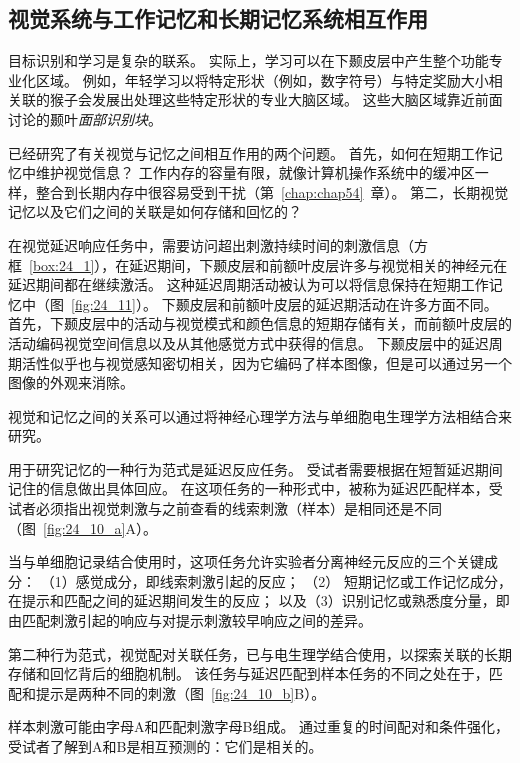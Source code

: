 \subsection{视觉系统与工作记忆和长期记忆系统相互作用}

目标识别和学习是复杂的联系。
实际上，学习可以在下颞皮层中产生整个功能专业化区域。
例如，年轻学习以将特定形状（例如，数字符号）与特定奖励大小相关联的猴子会发展出处理这些特定形状的专业大脑区域。
这些大脑区域靠近前面讨论的颞叶\textit{面部识别块}。


已经研究了有关视觉与记忆之间相互作用的两个问题。
首先，如何在短期工作记忆中维护视觉信息？
工作内存的容量有限，就像计算机操作系统中的缓冲区一样，整合到长期内存中很容易受到干扰（第~\ref{chap:chap54}~章）。
第二，长期视觉记忆以及它们之间的关联是如何存储和回忆的？


在视觉延迟响应任务中，需要访问超出刺激持续时间的刺激信息（方框~\ref{box:24_1}），在延迟期间，下颞皮层和前额叶皮层许多与视觉相关的神经元在延迟期间都在继续激活。
这种延迟周期活动被认为可以将信息保持在短期工作记忆中（图~\ref{fig:24_11}）。
下颞皮层和前额叶皮层的延迟期活动在许多方面不同。
首先，下颞皮层中的活动与视觉模式和颜色信息的短期存储有关，而前额叶皮层的活动编码视觉空间信息以及从其他感觉方式中获得的信息。
下颞皮层中的延迟周期活性似乎也与视觉感知密切相关，因为它编码了样本图像，但是可以通过另一个图像的外观来消除。


\begin{proposition}[视觉与工作记忆的相互作用研究] \label{box:24_1}
	
	\quad \quad 视觉和记忆之间的关系可以通过将神经心理学方法与单细胞电生理学方法相结合来研究。
	
	\quad \quad 用于研究记忆的一种行为范式是延迟反应任务。
	受试者需要根据在短暂延迟期间记住的信息做出具体回应。
	在这项任务的一种形式中，被称为延迟匹配样本，受试者必须指出视觉刺激与之前查看的线索刺激（样本）是相同还是不同（图~\ref{fig:24_10_a}A）。
	
	\quad \quad 当与单细胞记录结合使用时，这项任务允许实验者分离神经元反应的三个关键成分：
	（1）感觉成分，即线索刺激引起的反应；
	（2） 短期记忆或工作记忆成分，在提示和匹配之间的延迟期间发生的反应；
	以及（3）识别记忆或熟悉度分量，即由匹配刺激引起的响应与对提示刺激较早响应之间的差异。
	
	\quad \quad 第二种行为范式，视觉配对关联任务，已与电生理学结合使用，以探索关联的长期存储和回忆背后的细胞机制。
	该任务与延迟匹配到样本任务的不同之处在于，匹配和提示是两种不同的刺激（图~\ref{fig:24_10_b}B）。
	
	\quad \quad 样本刺激可能由字母A和匹配刺激字母B组成。
	通过重复的时间配对和条件强化，受试者了解到A和B是相互预测的：它们是相关的。
	
\end{proposition}


